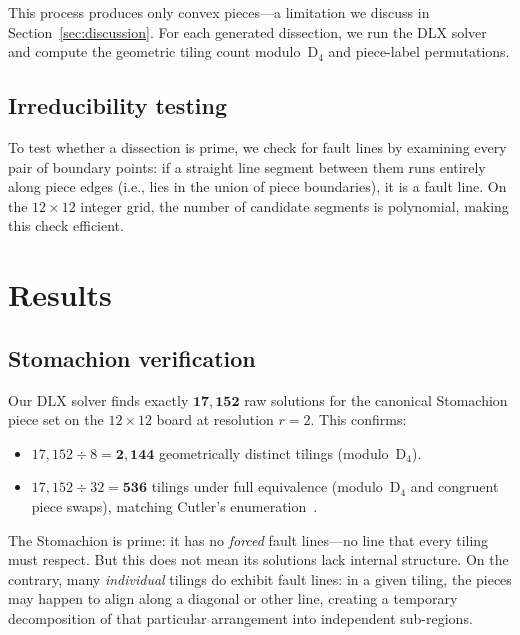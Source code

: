\documentclass[12pt]{article}
\theoremstyle{definition}
\theoremstyle{remark}
\newcommand{\D}{\mathrm{D}}
\begin{document}
This process produces only convex pieces---a limitation we discuss in
Section~\ref{sec:discussion}. For each generated dissection, we run the
DLX solver and compute the geometric tiling count modulo~$\D_4$ and
piece-label permutations.

\subsection{Irreducibility testing}

To test whether a dissection is prime, we check for fault lines by
examining every pair of boundary points: if a straight line segment
between them runs entirely along piece edges (i.e., lies in the union
of piece boundaries), it is a fault line. On the $12 \times 12$ integer
grid, the number of candidate segments is polynomial, making this check
efficient.

\section{Results}
\label{sec:results}

\subsection{Stomachion verification}
\label{sec:verification}

Our DLX solver finds exactly $\mathbf{17{,}152}$ raw solutions for the
canonical Stomachion piece set on the $12 \times 12$ board at resolution
$r = 2$. This confirms:

\begin{itemize}
  \item $17{,}152 \div 8 = \mathbf{2{,}144}$ geometrically distinct
    tilings (modulo~$\D_4$).
  \item $17{,}152 \div 32 = \mathbf{536}$ tilings under full
    equivalence (modulo~$\D_4$ and congruent piece swaps), matching
    Cutler's enumeration~\cite{Cutler2003}.
\end{itemize}

The Stomachion is prime: it has no \emph{forced} fault lines---no line
that every tiling must respect. But this does not mean its solutions lack
internal structure. On the contrary, many \emph{individual} tilings do
exhibit fault lines: in a given tiling, the pieces may happen to align
along a diagonal or other line, creating a temporary decomposition of
that particular arrangement into independent sub-regions.
\end{document}
